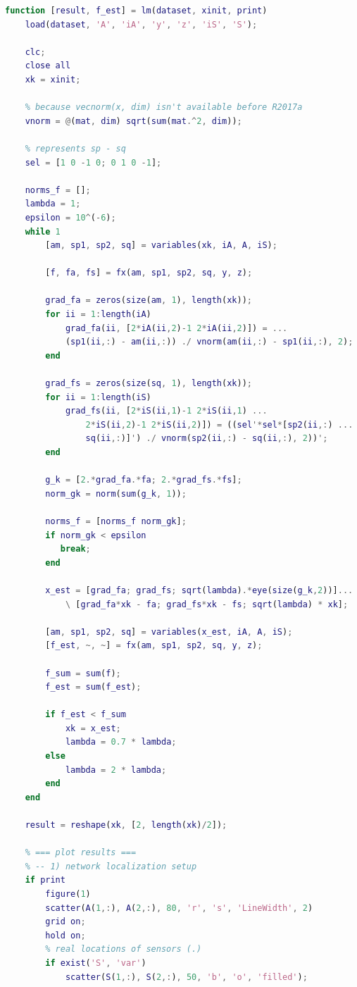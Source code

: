 \begin{lstlisting}[language=Matlab, caption=Matlab code for task 8., label=listing:task8:lm]
function [result, f_est] = lm(dataset, xinit, print)
    load(dataset, 'A', 'iA', 'y', 'z', 'iS', 'S');
    
    clc; 
    close all
    xk = xinit;

    % because vecnorm(x, dim) isn't available before R2017a
    vnorm = @(mat, dim) sqrt(sum(mat.^2, dim));

    % represents sp - sq
    sel = [1 0 -1 0; 0 1 0 -1];

    norms_f = [];
    lambda = 1;
    epsilon = 10^(-6);
    while 1
        [am, sp1, sp2, sq] = variables(xk, iA, A, iS);

        [f, fa, fs] = fx(am, sp1, sp2, sq, y, z);

        grad_fa = zeros(size(am, 1), length(xk));
        for ii = 1:length(iA)
            grad_fa(ii, [2*iA(ii,2)-1 2*iA(ii,2)]) = ...
            (sp1(ii,:) - am(ii,:)) ./ vnorm(am(ii,:) - sp1(ii,:), 2);
        end

        grad_fs = zeros(size(sq, 1), length(xk));
        for ii = 1:length(iS)
            grad_fs(ii, [2*iS(ii,1)-1 2*iS(ii,1) ...
                2*iS(ii,2)-1 2*iS(ii,2)]) = ((sel'*sel*[sp2(ii,:) ...
                sq(ii,:)]') ./ vnorm(sp2(ii,:) - sq(ii,:), 2))';
        end

        g_k = [2.*grad_fa.*fa; 2.*grad_fs.*fs];
        norm_gk = norm(sum(g_k, 1));

        norms_f = [norms_f norm_gk];
        if norm_gk < epsilon
           break; 
        end 

        x_est = [grad_fa; grad_fs; sqrt(lambda).*eye(size(g_k,2))]...
            \ [grad_fa*xk - fa; grad_fs*xk - fs; sqrt(lambda) * xk];

        [am, sp1, sp2, sq] = variables(x_est, iA, A, iS);
        [f_est, ~, ~] = fx(am, sp1, sp2, sq, y, z);
        
        f_sum = sum(f);
        f_est = sum(f_est);
        
        if f_est < f_sum
            xk = x_est;
            lambda = 0.7 * lambda;
        else
            lambda = 2 * lambda;
        end
    end

    result = reshape(xk, [2, length(xk)/2]);

    % === plot results ===
    % -- 1) network localization setup
    if print
        figure(1)
        scatter(A(1,:), A(2,:), 80, 'r', 's', 'LineWidth', 2)
        grid on;
        hold on;
        % real locations of sensors (.)
        if exist('S', 'var')
            scatter(S(1,:), S(2,:), 50, 'b', 'o', 'filled');


\end{lstlisting}
